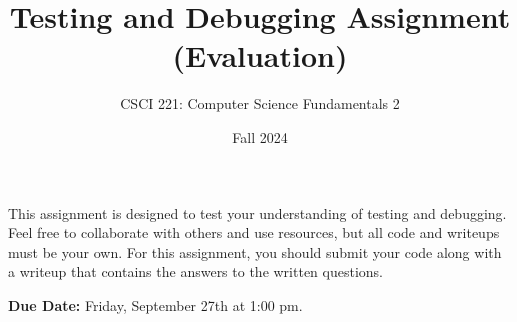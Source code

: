 \documentclass{exam}
\begin{document}
\title{Testing and Debugging Assignment (Evaluation)}
\author{CSCI 221: Computer Science Fundamentals 2}
\date{Fall 2024}
\maketitle


This assignment is designed to test your understanding of testing and debugging. 
Feel free to collaborate with others and use resources, but all code and writeups must be your own. 
For this assignment, you should submit your code along with a writeup that contains the answers to the written questions. 

\textbf{Due Date:}
Friday, September 27th at 1:00 pm. 
\end{document}

